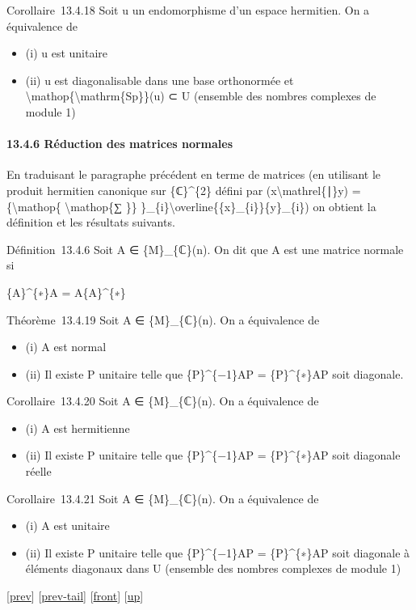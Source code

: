 \documentclass[]{article}
\begin{document}
Corollaire~13.4.18 Soit u un endomorphisme d'un espace hermitien. On a
équivalence de

\begin{itemize}
\itemsep1pt\parskip0pt
\item
  (i) u est unitaire
\item
  (ii) u est diagonalisable dans une base orthonormée et
  \textbackslash{}mathop\{\textbackslash{}mathrm\{Sp\}\}(u) ⊂ U
  (ensemble des nombres complexes de module 1)
\end{itemize}

\paragraph{13.4.6 Réduction des matrices normales}

En traduisant le paragraphe précédent en terme de matrices (en utilisant
le produit hermitien canonique sur \{ℂ\}\^{}\{2\} défini par
(x\textbackslash{}mathrel\{∣\}y) =\{\textbackslash{}mathop\{
\textbackslash{}mathop\{∑ \}\}
\}\_\{i\}\textbackslash{}overline\{\{x\}\_\{i\}\}\{y\}\_\{i\}) on
obtient la définition et les résultats suivants.

Définition~13.4.6 Soit A ∈ \{M\}\_\{ℂ\}(n). On dit que A est une matrice
normale si

\{A\}\^{}\{∗\}A = A\{A\}\^{}\{∗\}

Théorème~13.4.19 Soit A ∈ \{M\}\_\{ℂ\}(n). On a équivalence de

\begin{itemize}
\itemsep1pt\parskip0pt
\item
  (i) A est normal
\item
  (ii) Il existe P unitaire telle que \{P\}\^{}\{−1\}AP =
  \{P\}\^{}\{∗\}AP soit diagonale.
\end{itemize}

Corollaire~13.4.20 Soit A ∈ \{M\}\_\{ℂ\}(n). On a équivalence de

\begin{itemize}
\itemsep1pt\parskip0pt
\item
  (i) A est hermitienne
\item
  (ii) Il existe P unitaire telle que \{P\}\^{}\{−1\}AP =
  \{P\}\^{}\{∗\}AP soit diagonale réelle
\end{itemize}

Corollaire~13.4.21 Soit A ∈ \{M\}\_\{ℂ\}(n). On a équivalence de

\begin{itemize}
\itemsep1pt\parskip0pt
\item
  (i) A est unitaire
\item
  (ii) Il existe P unitaire telle que \{P\}\^{}\{−1\}AP =
  \{P\}\^{}\{∗\}AP soit diagonale à éléments diagonaux dans U (ensemble
  des nombres complexes de module 1)
\end{itemize}

{[}\href{coursse75.html}{prev}{]}
{[}\href{coursse75.html\#tailcoursse75.html}{prev-tail}{]}
{[}\href{coursse76.html}{front}{]}
{[}\href{coursch14.html\#coursse76.html}{up}{]}
\end{document}
